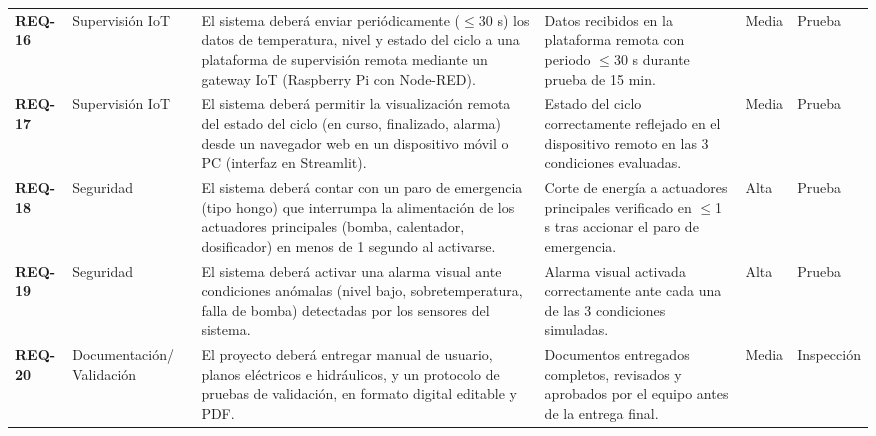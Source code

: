 \begin{longtable}{
  >{\bfseries}p{\colID}
  p{\colCat}
  p{\colReq}
  p{\colCrit}
  p{\colPrio}
  p{\colVer}
}
REQ-16 & Supervisión IoT & El sistema deberá enviar periódicamente ($\leq$30 s) los datos de temperatura, nivel y estado del ciclo a una plataforma de supervisión remota mediante un gateway IoT (Raspberry Pi con Node-RED). & Datos recibidos en la plataforma remota con periodo $\leq$30 s durante prueba de 15 min. & Media & Prueba \\[3pt]

REQ-17 & Supervisión IoT & El sistema deberá permitir la visualización remota del estado del ciclo (en curso, finalizado, alarma) desde un navegador web en un dispositivo móvil o PC (interfaz en Streamlit). & Estado del ciclo correctamente reflejado en el dispositivo remoto en las 3 condiciones evaluadas. & Media & Prueba \\[3pt]

REQ-18 & Seguridad & El sistema deberá contar con un paro de emergencia (tipo hongo) que interrumpa la alimentación de los actuadores principales (bomba, calentador, dosificador) en menos de 1 segundo al activarse. & Corte de energía a actuadores principales verificado en $\leq$1 s tras accionar el paro de emergencia. & Alta & Prueba \\[3pt]

REQ-19 & Seguridad & El sistema deberá activar una alarma visual ante condiciones anómalas (nivel bajo, sobretemperatura, falla de bomba) detectadas por los sensores del sistema. & Alarma visual activada correctamente ante cada una de las 3 condiciones simuladas. & Alta & Prueba \\[3pt]

REQ-20 & Documentación/ Validación & El proyecto deberá entregar manual de usuario, planos eléctricos e hidráulicos, y un protocolo de pruebas de validación, en formato digital editable y PDF. & Documentos entregados completos, revisados y aprobados por el equipo antes de la entrega final. & Media & Inspección \\

\end{longtable}
\endgroup